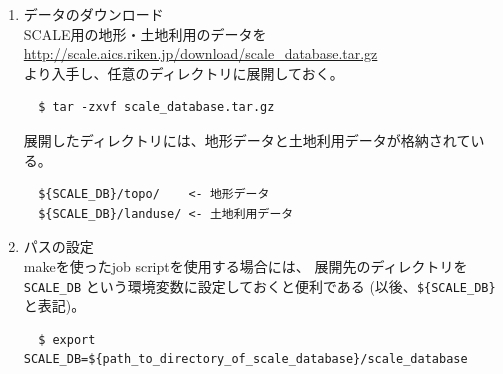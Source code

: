 \begin{enumerate}
\item データのダウンロード\\
SCALE用の地形・土地利用のデータを\\
 \url{http://scale.aics.riken.jp/download/scale_database.tar.gz}\\
より入手し、任意のディレクトリに展開しておく。
\begin{verbatim}
  $ tar -zxvf scale_database.tar.gz
\end{verbatim}
展開したディレクトリには、地形データと土地利用データが格納されている。
\begin{verbatim}
  ${SCALE_DB}/topo/    <- 地形データ
  ${SCALE_DB}/landuse/ <- 土地利用データ
\end{verbatim}

\item パスの設定\\
makeを使ったjob scriptを使用する場合には、
展開先のディレクトリを \verb|SCALE_DB| という環境変数に設定しておくと便利である
(以後、\verb|${SCALE_DB}|と表記)。
\begin{verbatim}
  $ export SCALE_DB=${path_to_directory_of_scale_database}/scale_database
\end{verbatim}
\end{enumerate}

